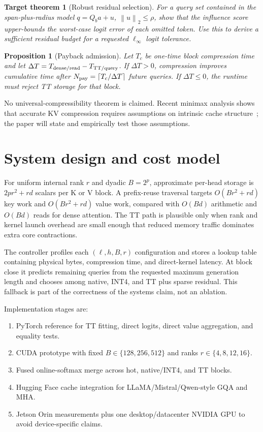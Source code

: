 \documentclass[11pt]{article}
\newtheorem{proposition}{Proposition}
\newtheorem{targettheorem}{Target theorem}
\newcommand{\norm}[1]{\left\lVert #1\right\rVert}
\begin{document}
\begin{targettheorem}[Robust residual selection]
For a query set contained in the span-plus-radius model
$q=Q_ba+u$, $\norm u_2\le\rho$, show that the influence score upper-bounds the worst-case logit
error of each omitted token. Use this to derive a sufficient residual budget for a requested
$\ell_\infty$ logit tolerance.
\end{targettheorem}

\begin{proposition}[Payback admission]
Let $T_c$ be one-time block compression time and let $\Delta T=T_{\rm dense/read}-T_{\rm TT/query}$.
If $\Delta T>0$, compression improves cumulative time after
$N_{\rm pay}=\lceil T_c/\Delta T\rceil$ future queries. If $\Delta T\le0$, the runtime must reject
TT storage for that block.
\end{proposition}

No universal-compressibility theorem is claimed. Recent minimax analysis shows that accurate KV
compression requires assumptions on intrinsic cache structure~\cite{riskkv}; the paper will state
and empirically test those assumptions.

\section{System design and cost model}

For uniform internal rank $r$ and dyadic $B=2^p$, approximate per-head storage is
$2pr^2+rd$ scalars per K or V block. A prefix-reuse traversal targets $O(Br^2+rd)$ key work and
$O(Br^2+rd)$ value work, compared with $O(Bd)$ arithmetic and $O(Bd)$ reads for dense attention.
The TT path is plausible only when rank and kernel launch overhead are small enough that reduced
memory traffic dominates extra core contractions.

The controller profiles each $(\ell,h,B,r)$ configuration and stores a lookup table containing
physical bytes, compression time, and direct-kernel latency. At block close it predicts remaining
queries from the requested maximum generation length and chooses among native, INT4, and TT plus
sparse residual. This fallback is part of the correctness of the systems claim, not an ablation.

Implementation stages are:
\begin{enumerate}[leftmargin=1.55em,itemsep=2pt]
\item PyTorch reference for TT fitting, direct logits, direct value aggregation, and equality tests.
\item CUDA prototype with fixed $B\in\{128,256,512\}$ and ranks $r\in\{4,8,12,16\}$.
\item Fused online-softmax merge across hot, native/INT4, and TT blocks.
\item Hugging Face cache integration for LLaMA/Mistral/Qwen-style GQA and MHA.
\item Jetson Orin measurements plus one desktop/datacenter NVIDIA GPU to avoid device-specific claims.
\end{enumerate}
\end{document}
